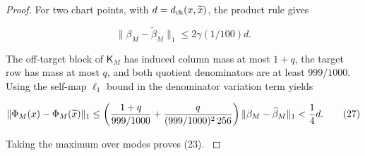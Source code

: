 \begin{lemma}
\begin{proof}
For two chart points, with \(d=d_{\rm ch}(x,\widetilde x)\), the product rule
gives

\[
\|\beta_M-\widetilde\beta_M\|_1
\le2\gamma(1/100)d.
\tag{26}
\]

The off-target block of \(\mathsf K_M\) has induced column mass at most \(1+q\), the
target row has mass at most \(q\), and both quotient denominators are at least
\(999/1000\). Using the self-map \(\ell_1\) bound in the denominator variation
term yields

\[
\|\Phi_M(x)-\Phi_M(\widetilde x)\|_1
\le\left({1+q\over999/1000}+
{q\over(999/1000)^2\,256}\right)
\|\beta_M-\widetilde\beta_M\|_1
< {1\over4}d.
\tag{27}
\]

Taking the maximum over modes proves (23). \(\)


\end{proof}
\end{lemma}
